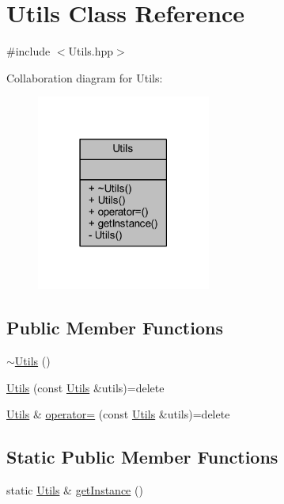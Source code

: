 \hypertarget{class_utils}{\section{Utils Class Reference}
\label{class_utils}
}


{\ttfamily \#include $<$Utils.\-hpp$>$}



Collaboration diagram for Utils\-:\nopagebreak
\begin{figure}[H]
\begin{center}
\leavevmode
\includegraphics[width=162pt]{class_utils__coll__graph}
\end{center}
\end{figure}
\subsection*{Public Member Functions}
\begin{DoxyCompactItemize}
\item 
\hyperlink{class_utils_afa5e70facffc286607498e7edb639b8a}{$\sim$\-Utils} ()
\item 
\hyperlink{class_utils_a1653aff7c075a5dd590d479d9b62242d}{Utils} (const \hyperlink{class_utils}{Utils} \&utils)=delete
\item 
\hyperlink{class_utils}{Utils} \& \hyperlink{class_utils_add93043cabc33d69f58b083f0e618849}{operator=} (const \hyperlink{class_utils}{Utils} \&utils)=delete
\end{DoxyCompactItemize}
\subsection*{Static Public Member Functions}
\begin{DoxyCompactItemize}
\item 
static \hyperlink{class_utils}{Utils} \& \hyperlink{class_utils_ad50ce773764e9114decc8c415cd38d3e}{get\-Instance} ()
\end{DoxyCompactItemize}
